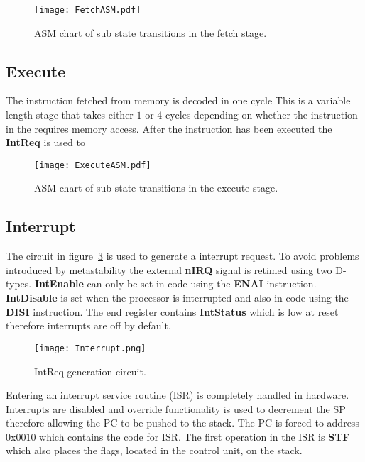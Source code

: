 \begin{figure}[ht]
   \centering
    \texttt{[image: FetchASM.pdf]}
		\caption{ASM chart of sub state transitions in the fetch stage.}
		\label{fig:FetchASM}
\end{figure}





\subsection{Execute}

The instruction fetched from memory is decoded in one cycle
This is a variable length stage that takes either $1$ or $4$ cycles depending on whether the instruction in the requires memory access.
After the instruction has been executed the \textbf{IntReq} is used to 


\begin{figure}[ht]
   \centering
    \texttt{[image: ExecuteASM.pdf]}
		\caption{ASM chart of sub state transitions in the execute stage.}
		\label{fig:ExecuteASM}
\end{figure}





\subsection{Interrupt}

The circuit in figure~\ref{fig:IntReqCircuit} is used to generate a interrupt request.
To avoid problems introduced by metastability the external \textbf{nIRQ} signal is retimed using two D-types.
\textbf{IntEnable} can only be set in code using the \textbf{ENAI} instruction.
\textbf{IntDisable} is set when the processor is interrupted and also in code using the \textbf{DISI} instruction.
The end register contains \textbf{IntStatus} which is low at reset therefore interrupts are off by default. 

\begin{figure}[ht]
   \centering
    \texttt{[image: Interrupt.png]}
		\caption{IntReq generation circuit.}
		\label{fig:IntReqCircuit}
\end{figure}


Entering an interrupt service routine (ISR) is completely handled in hardware. 
Interrupts are disabled and override functionality is used to decrement the SP therefore allowing the PC to be pushed to the stack.
The PC is forced to address $0$x$0010$ which contains the code for ISR. 
The first operation in the ISR is \textbf{STF} which also places the flags, located in the control unit, on the stack.

